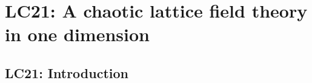 

\chapter{LC21: A chaotic lattice field theory in one dimension}
\label{chap:LC21}


\renewcommand{\statesp}{state space}
\renewcommand{\Statesp}{State space}
\renewcommand{\Refl}{\ensuremath{\sigma}}             %
\renewcommand{\shift}{\ensuremath{r}}
\renewcommand{\hopMat}{\shift} %
\renewcommand{\ssp}{\ensuremath{\phi}}             %
\renewcommand{\Xx}{\ensuremath{\mathsf{\Phi}}}      %
\renewcommand{\Ssym}[1]{{\ensuremath{m_{#1}}}}    %

\section{LC21: Introduction}
\label{s:LC21intro}
        \begin{quote} %
        \end{quote} %
    
\newpage %
    
\newpage %
    
    
    
\newpage %
    
\newpage %
    
\newpage %
    
\newpage %
    
\newpage %
    
\newpage %
    
\newpage %
    

\renewcommand{\Refl}{\ensuremath{\sigma}}             %
\renewcommand{\shift}{\ensuremath{d}}                 %
\renewcommand{\ssp}{x}
\renewcommand{\Xx}{\ensuremath{\mathsf{X}}}      %
\renewcommand{\Ssym}[1]{{\ensuremath{s_{#1}}}}  %

\printbibliography[heading=subbibintoc,title={References}]
